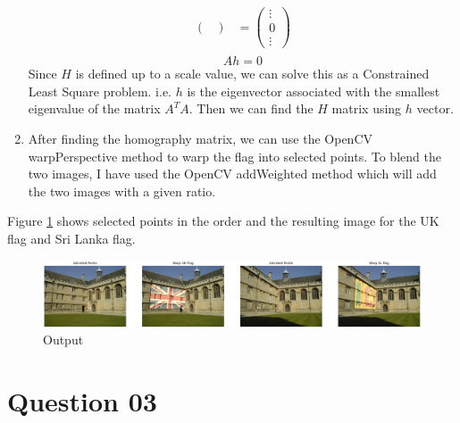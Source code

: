 \documentclass[a4paper]{article}
\begin{document}
\begin{enumerate}
\begin{align*}
\begin{pmatrix}
     \end{pmatrix}&=
     \begin{pmatrix}
       \vdots \\ 0 \\ \vdots
     \end{pmatrix}\\
   \end{align*}
   $$Ah=0$$
   Since $H$ is defined up to a scale value, we can solve
    this as a Constrained Least
     Square problem. i.e. $h$ is 
     the eigenvector associated with the smallest eigenvalue
      of the matrix $A^TA$. Then we can find the $H$ matrix using $h$ vector.
    \item After finding the homography matrix, we can use the
     OpenCV warpPerspective
      method to warp the flag into selected points.
       To blend the two images, I have used the OpenCV
        addWeighted method which will add the two images with
         a given ratio.
    \end{enumerate}
Figure \ref{q2} shows selected points in the order and the resulting
     image for the UK flag and Sri Lanka flag.


\begin{figure}[!htb]
  \centering
  \includegraphics[width=\textwidth]{images/q22.png}
  \caption{Output}
  \label{q2}
\end{figure}


\section*{Question 03}
\end{document}
